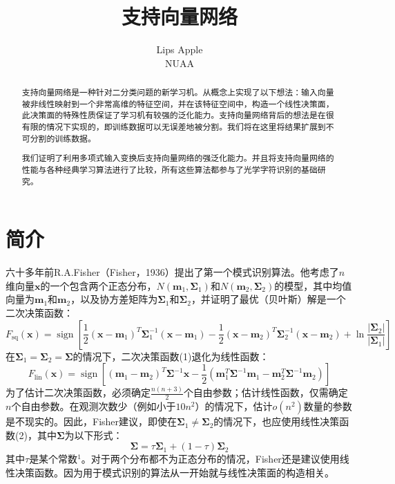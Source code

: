 \documentclass[lang=cn,11pt,a4paper]{elegantpaper}
\title{支持向量网络}
\author{Lips Apple \\ NUAA}
\institute{}
\date{\zhtoday}
\begin{document}
	\maketitle

	\begin{abstract}
	\qquad 支持向量网络是一种针对二分类问题的新学习机。从概念上实现了以下想法：输入向量被非线性映射到一个非常高维的特征空间，并在该特征空间中，构造一个线性决策面，此决策面的特殊性质保证了学习机有较强的泛化能力。支持向量网络背后的想法是在很有限的情况下实现的，即训练数据可以无误差地被分割。我们将在这里将结果扩展到不可分割的训练数据。

	我们证明了利用多项式输入变换后支持向量网络的强泛化能力。并且将支持向量网络的性能与各种经典学习算法进行了比较，所有这些算法都参与了光学字符识别的基础研究。
	\end{abstract}

	\section{简介}
	六十多年前R.A.Fisher（Fisher，1936）提出了第一个模式识别算法。他考虑了$n$维向量$\mathbf{x}$的一个包含两个正态分布，$N(\mathbf{m}_1,\mathbf{\Sigma}_1)$和$N(\mathbf{m}_2,\mathbf{\Sigma}_2)$的模型，其中均值向量为$\mathbf{m}_1$和$\mathbf{m}_2$，以及协方差矩阵为$\mathbf{\Sigma}_1$和$\mathbf{\Sigma}_2$，并证明了最优（贝叶斯）解是一个二次决策函数：
	\begin{equation}
		F_{\mathrm{sq}}(\mathbf{x})=\operatorname{sign}\left[\frac{1}{2}\left(\mathbf{x}-\mathbf{m}_{1}\right)^{T} \mathbf{\Sigma}_{1}^{-1}\left(\mathbf{x}-\mathbf{m}_{1}\right)-\frac{1}{2}\left(\mathbf{x}-\mathbf{m}_{2}\right)^{T} \mathbf{\Sigma}_{2}^{-1}\left(\mathbf{x}-\mathbf{m}_{2}\right)+\ln \frac{\left|\mathbf{\Sigma}_{2}\right|}{\left|\mathbf{\Sigma}_{1}\right|}\right]\tag{1}
	\end{equation}
	在$\mathbf{\Sigma}_{1}=\mathbf{\Sigma}_{2}=\mathbf{\Sigma}$的情况下，二次决策函数(1)退化为线性函数：
	\begin{equation}
		F_{\mathrm{lin}}(\mathbf{x})=\operatorname{sign}\left[\left(\mathbf{m}_{1}-\mathbf{m}_{2}\right)^{T} \mathbf{\Sigma}^{-1} \mathbf{x}-\frac{1}{2}\left(\mathbf{m}_{1}^{T} \mathbf{\Sigma}^{-1} \mathbf{m}_{1}-\mathbf{m}_{2}^{T} \mathbf{\Sigma}^{-1} \mathbf{m}_{2}\right)\right]\tag{2}
	\end{equation}
	为了估计二次决策函数，必须确定$\frac{n(n+3)}{2}$个自由参数；估计线性函数，仅需确定$n$个自由参数。在观测次数少（例如小于$10n^2$）的情况下，估计$o(n^2)$数量的参数是不现实的。因此，Fisher建议，即使在$\mathbf{\Sigma}_1\neq\mathbf{\Sigma}_2$的情况下，也应使用线性决策函数(2)，其中$\mathbf{\Sigma}$为以下形式：
	\begin{equation}
		\mathbf{\Sigma}=\tau\mathbf{\Sigma}_1+(1-\tau)\mathbf{\Sigma}_2\tag{3}
	\end{equation}
	其中$\tau$是某个常数$^1$。对于两个分布都不为正态分布的情况，Fisher还是建议使用线性决策函数。因为用于模式识别的算法从一开始就与线性决策面的构造相关。
\end{document}
